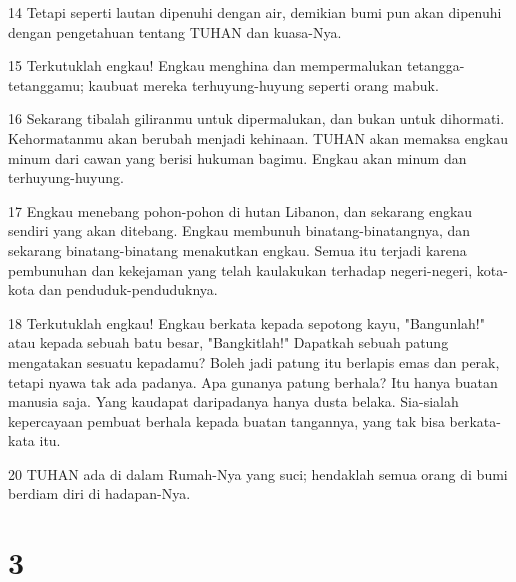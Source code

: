 \par 14 Tetapi seperti lautan dipenuhi dengan air, demikian bumi pun akan dipenuhi dengan pengetahuan tentang TUHAN dan kuasa-Nya.
\par 15 Terkutuklah engkau! Engkau menghina dan mempermalukan tetangga-tetanggamu; kaubuat mereka terhuyung-huyung seperti orang mabuk.
\par 16 Sekarang tibalah giliranmu untuk dipermalukan, dan bukan untuk dihormati. Kehormatanmu akan berubah menjadi kehinaan. TUHAN akan memaksa engkau minum dari cawan yang berisi hukuman bagimu. Engkau akan minum dan terhuyung-huyung.
\par 17 Engkau menebang pohon-pohon di hutan Libanon, dan sekarang engkau sendiri yang akan ditebang. Engkau membunuh binatang-binatangnya, dan sekarang binatang-binatang menakutkan engkau. Semua itu terjadi karena pembunuhan dan kekejaman yang telah kaulakukan terhadap negeri-negeri, kota-kota dan penduduk-penduduknya.
\par 18 Terkutuklah engkau! Engkau berkata kepada sepotong kayu, "Bangunlah!" atau kepada sebuah batu besar, "Bangkitlah!" Dapatkah sebuah patung mengatakan sesuatu kepadamu? Boleh jadi patung itu berlapis emas dan perak, tetapi nyawa tak ada padanya. Apa gunanya patung berhala? Itu hanya buatan manusia saja. Yang kaudapat daripadanya hanya dusta belaka. Sia-sialah kepercayaan pembuat berhala kepada buatan tangannya, yang tak bisa berkata-kata itu.
\par 20 TUHAN ada di dalam Rumah-Nya yang suci; hendaklah semua orang di bumi berdiam diri di hadapan-Nya.

\chapter{3}

